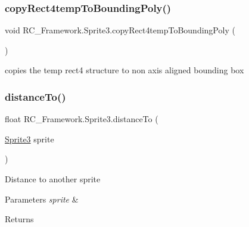 \subsubsection{\texorpdfstring{copy\+Rect4temp\+To\+Bounding\+Poly()}{copyRect4tempToBoundingPoly()}}
{\footnotesize\ttfamily void R\+C\+\_\+\+Framework.\+Sprite3.\+copy\+Rect4temp\+To\+Bounding\+Poly (\begin{DoxyParamCaption}{ }\end{DoxyParamCaption})}



copies the temp rect4 structure to non axis aligned bounding box ~\newline


\mbox{\label{class_r_c___framework_1_1_sprite3_a58e467760eaf53fa02f50fb4129861c3}} 
\subsubsection{\texorpdfstring{distance\+To()}{distanceTo()}\hspace{0.1cm}{\footnotesize\ttfamily [1/2]}}
{\footnotesize\ttfamily float R\+C\+\_\+\+Framework.\+Sprite3.\+distance\+To (\begin{DoxyParamCaption}\item[{\mbox{\hyperlink{class_r_c___framework_1_1_sprite3}{Sprite3}}}]{sprite }\end{DoxyParamCaption})}



Distance to another sprite 


\begin{DoxyParams}{Parameters}
{\em sprite} & \\
\hline
\end{DoxyParams}
\begin{DoxyReturn}{Returns}

\end{DoxyReturn}
\mbox{\label{class_r_c___framework_1_1_sprite3_ab41ca8d75520f2b6e11ba943d7eb3f77}} 
